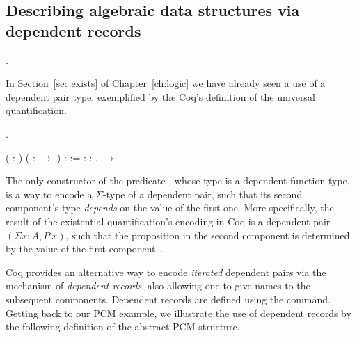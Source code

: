 

\newpage


\subsection{Describing algebraic data structures via dependent records}




\begin{coqdoccode}
\coqdocemptyline
\coqdocnoindent
{} .\coqdoceol
\coqdocemptyline
\end{coqdoccode}


In Section~\ref{sec:exists} of Chapter~\ref{ch:logic} we have
already seen a use of a dependent pair type, exemplified by the Coq's
definition of the universal quantification.


\begin{coqdoccode}
\coqdocemptyline
\coqdocnoindent
{} .\coqdoceol
\coqdocemptyline
\end{coqdoccode}
\coqdoceol
\coqdocemptyline
\coqdocnoindent
{}  ( : ) ( :  \ensuremath{\rightarrow} ) :  :=\coqdoceol
\coqdocindent{2.00em}
 : \coqdockw{\ensuremath{\forall}}  : ,   \ensuremath{\rightarrow}  

\coqdocemptyline


The only constructor  of the predicate , whose type is a
dependent function type, is a way to encode a $\Sigma$-type of a
dependent pair, such that its second component's type \textit{depends} on the
value of the first one. More specifically, the
result of the existential quantification's encoding in Coq is a
dependent pair $(\Sigma x:A, P~x)$, such that the proposition in
the second component is determined by the value of the first
component~.




Coq provides an alternative way to encode \textit{iterated} dependent pairs
via the mechanism of \textit{dependent records}, also allowing one to give
names to the subsequent components. Dependent records are defined
using the  command. Getting back to our PCM example, we
illustrate the use of dependent records by the following definition of
the abstract PCM structure.


